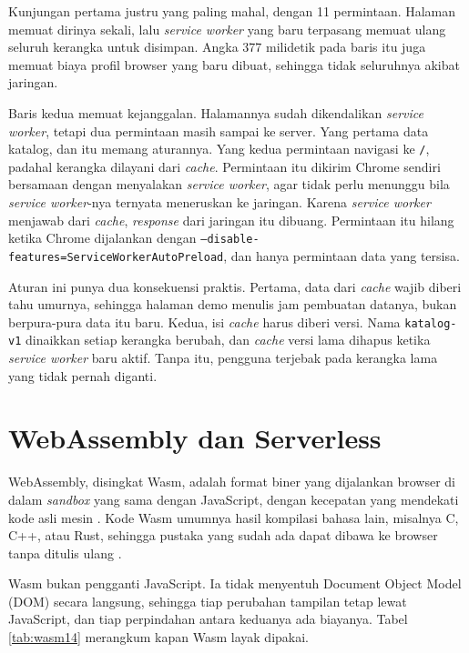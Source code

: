 Kunjungan pertama justru yang paling mahal, dengan 11 permintaan. Halaman
memuat dirinya sekali, lalu \textit{service worker} yang baru terpasang
memuat ulang seluruh kerangka untuk disimpan. Angka 377 milidetik pada baris
itu juga memuat biaya profil browser yang baru dibuat, sehingga tidak
seluruhnya akibat jaringan.

Baris kedua memuat kejanggalan. Halamannya sudah dikendalikan
\textit{service worker}, tetapi dua permintaan masih sampai ke server. Yang
pertama data katalog, dan itu memang aturannya. Yang kedua permintaan
navigasi ke \texttt{/}, padahal kerangka dilayani dari \textit{cache}.
Permintaan itu dikirim Chrome sendiri bersamaan dengan menyalakan
\textit{service worker}, agar tidak perlu menunggu bila \textit{service
worker}-nya ternyata meneruskan ke jaringan. Karena \textit{service worker}
menjawab dari \textit{cache}, \textit{response} dari jaringan itu dibuang. Permintaan itu
hilang ketika Chrome dijalankan dengan
\texttt{--disable-features=ServiceWorkerAutoPreload}, dan hanya permintaan
data yang tersisa.

Aturan ini punya dua konsekuensi praktis. Pertama, data dari \textit{cache}
wajib diberi tahu umurnya, sehingga halaman demo menulis jam pembuatan
datanya, bukan berpura-pura data itu baru. Kedua, isi \textit{cache} harus
diberi versi. Nama \texttt{katalog-v1} dinaikkan setiap kerangka berubah, dan
\textit{cache} versi lama dihapus ketika \textit{service worker} baru aktif.
Tanpa itu, pengguna terjebak pada kerangka lama yang tidak pernah diganti.

\section{WebAssembly dan Serverless}

WebAssembly, disingkat Wasm, adalah format biner yang dijalankan browser di
dalam \textit{sandbox} yang sama dengan JavaScript, dengan kecepatan yang
mendekati kode asli mesin \cite{haas2017wasm}. Kode Wasm umumnya hasil
kompilasi bahasa lain, misalnya C, C++, atau Rust, sehingga pustaka yang
sudah ada dapat dibawa ke browser tanpa ditulis ulang
\cite{w3c-wasm-core}.

Wasm bukan pengganti JavaScript. Ia tidak menyentuh Document Object Model
(DOM) secara langsung, sehingga tiap perubahan tampilan tetap lewat
JavaScript, dan tiap perpindahan antara keduanya ada biayanya. Tabel
\ref{tab:wasm14} merangkum kapan Wasm layak dipakai.

